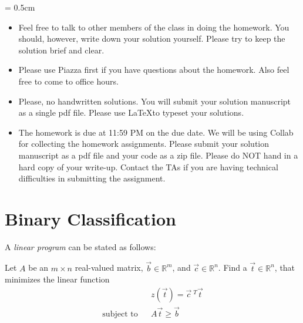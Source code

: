 
\usepackage{graphicx}
\usepackage{subfigure}
\usepackage{amsmath}
\usepackage{amssymb}
\usepackage{epsfig}
\usepackage{enumerate}
\usepackage{color}
\usepackage{algorithmic}
\usepackage{hyperref}


\sloppy
\parskip = 0.5cm

\newcommand{\ignore}[1]{}
\newcommand{\pp}{\noindent}
\newcommand{\ov}{\overline}
\newcommand{\bb}[1]{{\bf #1}}
\renewcommand{\labelitemii}{\tiny$\circ$}

\newcommand{\question}[1]{#1}%
%
\newcommand{\answer}[2]{{
\vspace{10pt} 
\color{red}{#2}
\vspace{10pt}
}
}
\newcommand{\comment}[1]{}


\oddsidemargin 0in
\evensidemargin 0in
\textwidth 6.5in
\topmargin -0.5in
\textheight 9.0in


\setlength{\unitlength}{1mm}

\thispagestyle{plain}
\newpage
{}

\begin{itemize}
\item Feel free to talk to other members of the class in doing the homework. You should, however,
write down your solution yourself.  Please try to keep the solution brief and clear.

\item Please use Piazza first if you have questions about the homework. Also feel free to come to office hours.

\item Please, no handwritten solutions. You will submit your solution manuscript as a single pdf file. Please use \LaTeX to typeset your solutions.

\item The homework is due at 11:59 PM on the due date. We will be using
Collab for collecting the homework assignments. Please submit your solution manuscript as a pdf file and your code as a zip file.  Please do NOT hand in a hard copy of your write-up.
Contact the TAs if you are having technical difficulties in 
submitting the assignment. 
\end{itemize}



\section{Binary Classification} 
A {\em linear program} can be stated as follows:
\begin{definition}
Let 
$A$ be an $m \times n$ real-valued matrix,
$\vec{b} \in \mathbb{R}^m$, and $\vec{c} \in \mathbb{R}^n$.
Find a $\vec{t} \in \mathbb{R}^n$, that minimizes the linear function
\begin{eqnarray*}
  & & z(\vec{t}) = \vec{c}~^T \vec{t} \\
\textrm{subject to} & & A \vec{t} \geq \vec{b}
\end{eqnarray*}
\end{definition}

